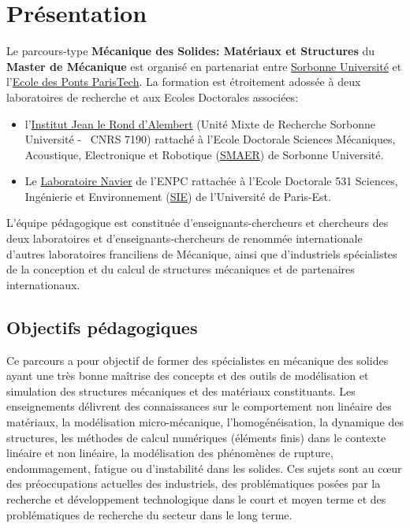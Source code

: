 \documentclass[french,11pt]{article}
\begin{document}
\section{Présentation}

\pagestyle{fancy}
\fancyhead[L]{}
\fancyfoot[C]{\thepage}

Le parcours-type \textbf{Mécanique des Solides: Matériaux et Structures}
du \textbf{Master de Mécanique} est organisé en partenariat entre \href{https://www.sorbonne-universite.fr}{Sorbonne
Université} et 
l'\href{https://www.enpc.fr}{Ecole des Ponts ParisTech}. 
La formation est
étroitement adossée à deux laboratoires de recherche et aux Ecoles Doctorales associées:

\begin{itemize}
\item
  l'\href{http://www.dalembert.upmc.fr}{Institut Jean le Rond d'Alembert} (Unité Mixte de Recherche Sorbonne
  Université -~ CNRS 7190) rattaché à l'Ecole Doctorale Sciences Mécaniques, Acoustique, Electronique et Robotique (\href{http://www.ed391.upmc.fr}{SMAER}) de
  Sorbonne Université.
\item
  Le \href{https://navier.enpc.fr/}{Laboratoire Navier} de l'ENPC 
  rattachée à l'Ecole Doctorale 531 Sciences, Ingénierie et Environnement 
  (\href{http://www.univ-paris-est.fr/fr/-ecole-doctorale-sciences-ingenierie-et-environnement-sie-ed-531-/
}{SIE}) de
  l'Université de Paris-Est.
  

\end{itemize}
L'équipe pédagogique est constituée d'enseignants-chercheurs et chercheurs
des deux laboratoires et d'enseignants-chercheurs de
renommée internationale d'autres laboratoires franciliens de
Mécanique, ainsi que d'industriels spécialistes de la conception et du
calcul de structures mécaniques et de partenaires internationaux. %



\subsection{Objectifs pédagogiques}

Ce parcours a pour objectif de former des spécialistes en mécanique des
solides ayant une très bonne maîtrise des concepts et des outils de
modélisation et simulation des structures mécaniques et des matériaux
constituants. 
Les enseignements délivrent des connaissances sur le
comportement non linéaire des matériaux, la modélisation micro-mécanique,
l'homogénéisation, la dynamique des structures, les méthodes de calcul
numériques (éléments finis) dans le contexte linéaire et  non linéaire, la
modélisation des phénomènes de rupture, endommagement, fatigue ou
d'instabilité dans les solides. 
Ces sujets sont au cœur des préoccupations actuelles des industriels, des problématiques posées par la recherche et développement technologique dans le court et moyen terme et des problématiques de recherche du secteur dans le long terme.
\end{document}
